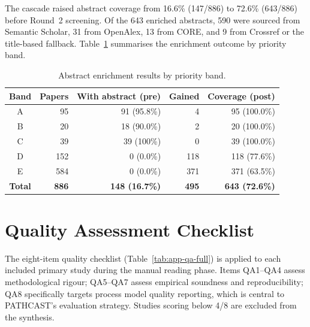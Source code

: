 The cascade raised abstract coverage from 16.6\% (147/886) to 72.6\%
(643/886) before Round~2 screening. Of the 643 enriched abstracts,
590 were sourced from Semantic Scholar, 31 from OpenAlex, 13 from CORE,
and 9 from Crossref or the title-based fallback.
Table~\ref{tab:app-enrichment-stats} summarises the enrichment outcome
by priority band.

\begin{table}[htbp]
\centering
\caption{Abstract enrichment results by priority band.}
\label{tab:app-enrichment-stats}
\small
\setlength{\tabcolsep}{4pt}
\begin{tabular}{c r r r r}
\toprule
\textbf{Band} & \textbf{Papers} & \textbf{With abstract (pre)} &
  \textbf{Gained} & \textbf{Coverage (post)} \\
\midrule
A &  95 & 91 (95.8\%) &   4 &  95 (100.0\%) \\
B &  20 & 18 (90.0\%) &   2 &  20 (100.0\%) \\
C &  39 & 39 (100\%)  &   0 &  39 (100.0\%) \\
D & 152 &  0  (0.0\%) & 118 & 118  (77.6\%) \\
E & 584 &  0  (0.0\%) & 371 & 371  (63.5\%) \\
\midrule
\textbf{Total} & \textbf{886} & \textbf{148 (16.7\%)} &
  \textbf{495} & \textbf{643 (72.6\%)} \\
\bottomrule
\end{tabular}
\end{table}

\section{Quality Assessment Checklist}
\label{app:slr-qa}

The eight-item quality checklist (Table~\ref{tab:app-qa-full}) is applied
to each included primary study during the manual reading phase. Items
QA1--QA4 assess methodological rigour; QA5--QA7 assess empirical soundness
and reproducibility; QA8 specifically targets process model quality reporting,
which is central to PATHCAST's evaluation strategy. Studies scoring below
4/8 are excluded from the synthesis.

